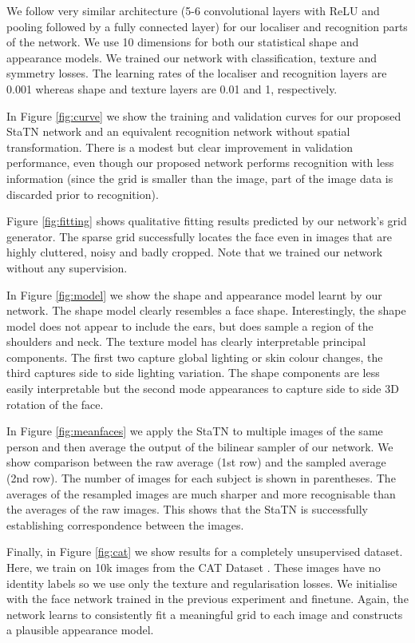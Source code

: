 \documentclass[runningheads]{llncs}
\begin{document}
We follow very similar architecture (5-6 convolutional layers with ReLU and pooling followed by a fully connected layer) for our localiser and recognition parts of the network.
We use 10 dimensions for both our statistical shape and appearance models. We trained our network with classification, texture and symmetry losses.
The learning rates of the localiser and recognition layers are 0.001 whereas shape and texture layers are 0.01 and 1, respectively.

In Figure \ref{fig:curve} we show the training and validation curves for our proposed StaTN network and an equivalent recognition network without spatial transformation. There is a modest but clear improvement in validation performance, even though our proposed network performs recognition with less information (since the grid is smaller than the image, part of the image data is discarded prior to recognition).

Figure \ref{fig:fitting} shows qualitative fitting results predicted by our network's grid generator. The sparse grid successfully locates the face even in images that are highly cluttered, noisy and badly cropped. Note that we trained our network without any supervision.

In Figure \ref{fig:model} we show the shape and appearance model learnt by our network. The shape model clearly resembles a face shape. Interestingly, the shape model does not appear to include the ears, but does sample a region of the shoulders and neck. The texture model has clearly interpretable principal components. The first two capture global lighting or skin colour changes, the third captures side to side lighting variation. The shape components are less easily interpretable but the second mode appearances to capture side to side 3D rotation of the face.

In Figure \ref{fig:meanfaces} we apply the StaTN to multiple images of the same person and then average the output of the bilinear sampler of our network. We show comparison between the raw average (1st row) and the sampled average (2nd row). The number of images for each subject is shown in parentheses. The averages of the resampled images are much sharper and more recognisable than the averages of the raw images. This shows that the StaTN is successfully establishing correspondence between the images.

Finally, in Figure \ref{fig:cat} we show results for a completely unsupervised dataset. Here, we train on 10k images from the CAT Dataset \cite{zhang2008cat}. These images have no identity labels so we use only the texture and regularisation losses. We initialise with the face network trained in the previous experiment and finetune. Again, the network learns to consistently fit a meaningful grid to each image and constructs a plausible appearance model.
\end{document}
